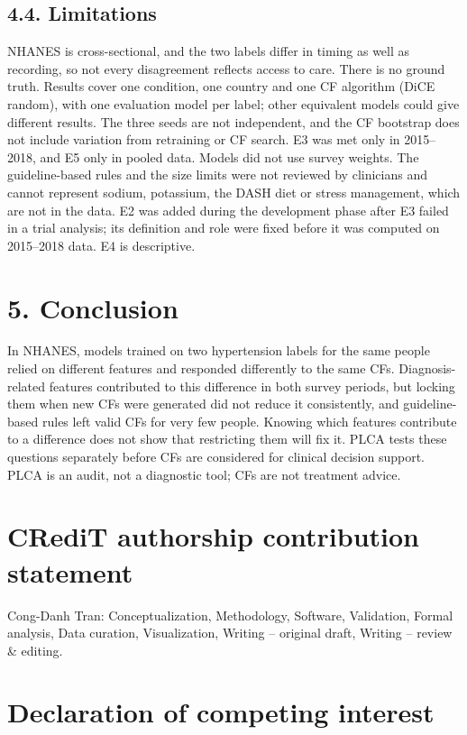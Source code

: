 \documentclass[
  11pt,
]{article}
\begin{document}
\subsection{4.4. Limitations}

NHANES is cross-sectional, and the two labels differ in timing as well
as recording, so not every disagreement reflects access to care. There
is no ground truth. Results cover one condition, one country and one CF
algorithm (DiCE random), with one evaluation model per label; other
equivalent models could give different results. The three seeds are not
independent, and the CF bootstrap does not include variation from
retraining or CF search. E3 was met only in 2015--2018, and E5 only in
pooled data. Models did not use survey weights. The guideline-based
rules and the size limits were not reviewed by clinicians and cannot
represent sodium, potassium, the DASH diet or stress management, which
are not in the data. E2 was added during the development phase after E3
failed in a trial analysis; its definition and role were fixed before it
was computed on 2015--2018 data. E4 is descriptive.

\section{5. Conclusion}

In NHANES, models trained on two hypertension labels for the same people
relied on different features and responded differently to the same CFs.
Diagnosis-related features contributed to this difference in both survey
periods, but locking them when new CFs were generated did not reduce it
consistently, and guideline-based rules left valid CFs for very few
people. Knowing which features contribute to a difference does not show
that restricting them will fix it. PLCA tests these questions separately
before CFs are considered for clinical decision support. PLCA is an
audit, not a diagnostic tool; CFs are not treatment advice.

\section{CRediT authorship contribution statement}

Cong-Danh Tran: Conceptualization, Methodology, Software, Validation,
Formal analysis, Data curation, Visualization, Writing -- original
draft, Writing -- review \& editing.

\section{Declaration of competing interest}
\end{document}
